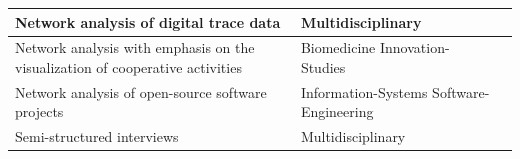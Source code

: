 \documentclass[CHICAGO,Times1COL]{WileyNJDv5} %
\begin{document}
\begin{table}[h]
\begin{threeparttable}
\begin{tabular}{|l|m{3.1cm}|m{4.3cm}|}
\hline
  {Network analysis of digital trace data} & 
  {\centering   Multidisciplinary} & 
 
 { %
 \citet{hahn_emergence_2008}   \newline
 \citet{howison2012validity} %
 } \\
 \hline
  {Network  analysis with emphasis on the visualization of cooperative activities } &
 {\centering Biomedicine  \newline Innovation-Studies }
 & 
 
 { %
 \citet{lundvall1992} \newline 
 \citet{cambrosio_mapping_2004} %
} \\
 \hline
 {Network  analysis of open-source software projects } &
 {\centering   Information-Systems \newline Software-Engineering }
 &
 \citet{McCleanGreer_et_al2021} \newline
 \citet{HerboldAmirfallah_et_al2021}
\\
 \hline
 {Semi-structured interviews } &
 {\centering   Multidisciplinary}
 &
 \citet{galletta2013mastering}  \newline \citet{Adams2015}
\\
 \bottomrule
\end{tabular}
%
%


\end{threeparttable}
\end{table}
\end{document}
